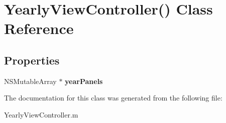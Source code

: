 \hypertarget{interface_yearly_view_controller_07_08}{\section{\-Yearly\-View\-Controller() \-Class \-Reference}
\label{interface_yearly_view_controller_07_08}
}
\subsection*{\-Properties}
\begin{DoxyCompactItemize}
\item 
\hypertarget{interface_yearly_view_controller_07_08_a05576d69588318e09b7575aac0382f3a}{\-N\-S\-Mutable\-Array $\ast$ {\bfseries year\-Panels}}\label{interface_yearly_view_controller_07_08_a05576d69588318e09b7575aac0382f3a}

\end{DoxyCompactItemize}


\-The documentation for this class was generated from the following file\-:\begin{DoxyCompactItemize}
\item 
\-Yearly\-View\-Controller.\-m\end{DoxyCompactItemize}
